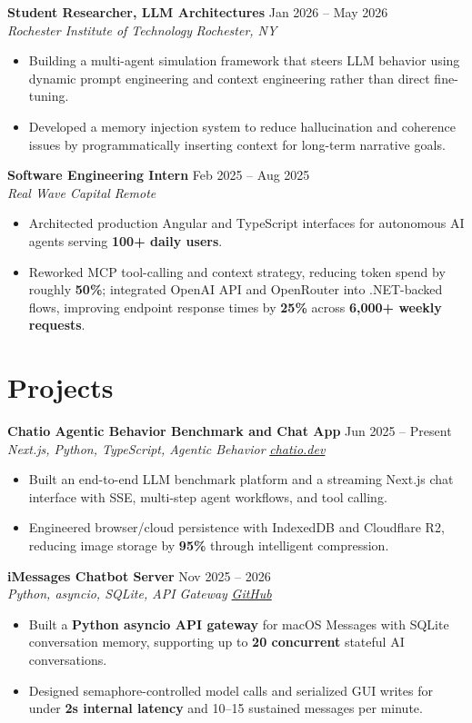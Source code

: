 \documentclass[10pt,letterpaper]{article}
\newif\ifresumeFirstRole
\newcommand{\resumeRole}[4]{%
  \ifresumeFirstRole
    \global\resumeFirstRolefalse
  \else
    \vspace{0pt plus 1fill}%
  \fi
  \textbf{#1} \hfill #2\\
  \textit{#3} \hfill \textit{#4}
}
\begin{document}
\resumeRole{Student Researcher, LLM Architectures}{Jan 2026 -- May 2026}{Rochester Institute of Technology}{Rochester, NY}
\begin{itemize}
  \item Building a multi-agent simulation framework that steers LLM behavior using dynamic prompt engineering and context engineering rather than direct fine-tuning.
  \item Developed a memory injection system to reduce hallucination and coherence issues by programmatically inserting context for long-term narrative goals.
\end{itemize}

\resumeRole{Software Engineering Intern}{Feb 2025 -- Aug 2025}{Real Wave Capital}{Remote}
\begin{itemize}
  \item Architected production Angular and TypeScript interfaces for autonomous AI agents serving \textbf{100+ daily users}.
  \item Reworked MCP tool-calling and context strategy, reducing token spend by roughly \textbf{50\%}; integrated OpenAI API and OpenRouter into .NET-backed flows, improving endpoint response times by \textbf{25\%} across \textbf{6,000+ weekly requests}.
\end{itemize}

\section*{Projects}
\resumeRole{Chatio Agentic Behavior Benchmark and Chat App}{Jun 2025 -- Present}{Next.js, Python, TypeScript, Agentic Behavior}{\href{https://chatio.dev}{chatio.dev}}
\begin{itemize}
  \item Built an end-to-end LLM benchmark platform and a streaming Next.js chat interface with SSE, multi-step agent workflows, and tool calling.
  \item Engineered browser/cloud persistence with IndexedDB and Cloudflare R2, reducing image storage by \textbf{95\%} through intelligent compression.
\end{itemize}

\resumeRole{iMessages Chatbot Server}{Nov 2025 -- 2026}{Python, asyncio, SQLite, API Gateway}{\href{https://github.com/alextyhwang/iMessages-Chatbot-Server}{GitHub}}
\begin{itemize}
  \item Built a \textbf{Python asyncio API gateway} for macOS Messages with SQLite conversation memory, supporting up to \textbf{20 concurrent} stateful AI conversations.
  \item Designed semaphore-controlled model calls and serialized GUI writes for under \textbf{2s internal latency} and 10--15 sustained messages per minute.
\end{itemize}
\end{document}
